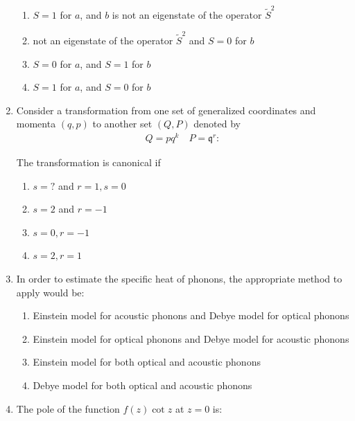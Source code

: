 \documentclass[journal,12pt,onecolumn]{IEEEtran}
\begin{document}
\begin{enumerate}[itemsep=0.45cm]
\hfill{}


\begin{enumerate}
\item $S = 1$ for $a$, and $b$ is not an eigenstate of the operator $\tilde{S}^2$
\item not an eigenstate of the operator $\tilde{S}^2$ and $S=0$ for $b$
\item $S=0$ for $a$, and $S=1$ for $b$
\item $S=1$ for $a$, and $S=0$ for $b$
\end{enumerate}


\item Consider a transformation from one set of generalized coordinates and momenta $(q,p)$ to another set $(Q,P)$ denoted by
\begin{align*}    
Q = p q^k \quad 
P = \mathfrak{q}^r:
\end{align*}


The transformation is canonical if 

\hfill{}


\begin{multicols}{4}
\begin{enumerate}
\item $s = ?$ and $r = 1, s=0$
\item $s = 2$ and $r = -1$
\item $s = 0, r = -1$
\item $s = 2, r = 1$
\end{enumerate}
\end{multicols}

\item In order to estimate the specific heat of phonons, the appropriate method to apply would be:

\hfill{}

\begin{enumerate}
\item Einstein model for acoustic phonons and Debye model for optical phonons
\item Einstein model for optical phonons and Debye model for acoustic phonons
\item Einstein model for both optical and acoustic phonons
\item Debye model for both optical and acoustic phonons
\end{enumerate}


\item The pole of the function $f(z)\cot z$ at $z = 0$ is:


\end{enumerate}
\end{document}
